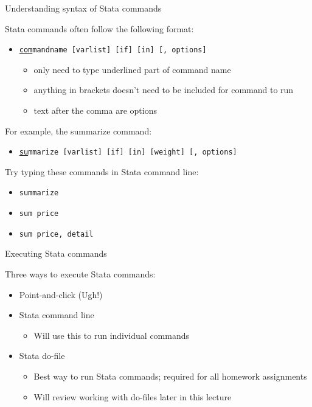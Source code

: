 \begin{frame}{Understanding syntax of Stata commands}
	
	Stata commands often follow the following format:
	
	\begin{itemize}
		\item [] \texttt{\underline{com}mandname [varlist] [if] [in] [, options]}	
		\begin{itemize}
			\item only need to type underlined part of command name
			\item anything in brackets doesn't need to be included for command to run
			\item  text after the comma are options
		\end{itemize}		
	\end{itemize}
	
	\vspace{3mm}
	For example, the summarize command:
	\begin{itemize}
		\item [] 	\texttt{\underline{su}mmarize [varlist] [if] [in] [weight] [, options]}
	\end{itemize}	
	
	\vspace{3mm}
	Try typing these commands in Stata command line:
	\begin{itemize}
		\item [] \texttt{summarize}
		\item [] \texttt{sum price}
		\item [] \texttt{sum price, detail}		
	\end{itemize}	
	
\end{frame}

\begin{frame}{Executing Stata commands}

	Three ways to execute Stata commands:	
	\vspace{2mm}	
	\begin{itemize}
		\item Point-and-click (Ugh!)
		\item Stata command line
		\begin{itemize}
			\item Will use this to run individual commands
		\end{itemize}			
		\item Stata do-file
		\begin{itemize}
			\item Best way to run Stata commands; required for all homework assignments
			\item Will review working with do-files later in this lecture
		\end{itemize}			
	\end{itemize}	
	
\end{frame}

